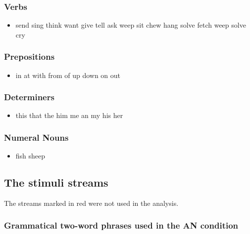 \documentclass[11pt,a4wide]{article}
\begin{document}
\subsubsection*{Verbs}
\begin{itemize}
  \item send sing think want give tell ask weep sit chew hang solve
    fetch weep solve cry
\end{itemize}

\subsubsection*{Prepositions}
\begin{itemize}
  \item in at with from of up down on out
\end{itemize}

\subsubsection*{Determiners}
\begin{itemize}
  \item this that the him me an my his her
\end{itemize}

\subsubsection*{Numeral Nouns}
\begin{itemize}
  \item fish sheep
  
\end{itemize}

\subsection*{The stimuli streams}

The streams marked in red were not used in the analysis.

\subsubsection*{Grammatical two-word phrases used in the AN condition}
\end{document}
